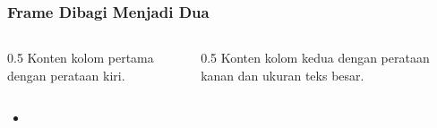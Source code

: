 
\begin{frame}
  \frametitle{Frame Dibagi Menjadi Dua}

  \begin{columns} %
    \begin{column}{0.5\textwidth}
      \justifying %
      \tiny %
      Konten kolom pertama dengan perataan kiri.
    \end{column}
    
    \begin{column}{0.5\textwidth} %
      \justifying %
      \tiny %
      Konten kolom kedua dengan perataan kanan dan ukuran teks besar.
    \end{column}
  \end{columns}
\end{frame}

\begin{itemize}
    \item[$\Rightarrow$]
\end{itemize}








\fontsize{4}{6}